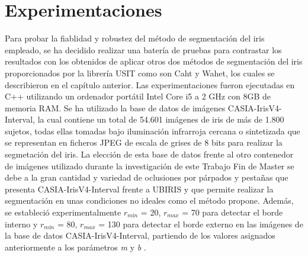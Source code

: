 


\section{Experimentaciones}

Para probar la fiablidad y robustez del método de segmentación del iris empleado, se ha decidido realizar una batería de pruebas para contrastar los resultados con los obtenidos de aplicar otros dos métodos de segmentación del iris proporcionados por la librería USIT como son Caht y Wahet, los cuales se describieron en el capítulo anterior. Las experimentaciones fueron ejecutadas en C++ utilizando un ordenador portátil Intel Core i5 a 2 GHz con 8GB de memoria RAM. Se ha utilizado la base de datos de imágenes CASIA-IrisV4-Interval, la cual contiene un total de 54.601 imágenes de iris de más de 1.800 sujetos, todas ellas tomadas bajo iluminación infrarroja cercana o sintetizada que se representan en ficheros JPEG de escala de grises de 8 bits para realizar la segmetación del iris. La elección de esta base de datos frente al otro contenedor de imágenes utilizado durante la investigación de este Trabajo Fin de Master se debe a la gran cantidad y variedad de oclusiones por párpados y pestañas que presenta CASIA-IrisV4-Interval frente a UBIRIS y que permite realizar la segmentación en unas condiciones no ideales como el método propone. Además, se estableció experimentalmente $r_{mín}$ = 20, $r_{max}$ = 70 para detectar el borde interno y $r_{mín}$ = 80, $r_{max}$ = 130 para detectar el borde externo en las imágenes de la base de datos CASIA-IrisV4-Interval, partiendo de los valores asignados anteriormente a los parámetros \textit{m} y \textit{b} . \\  \\  \\ \\ \\ \\ \\ \\ \\ \\ \\ \\ 

